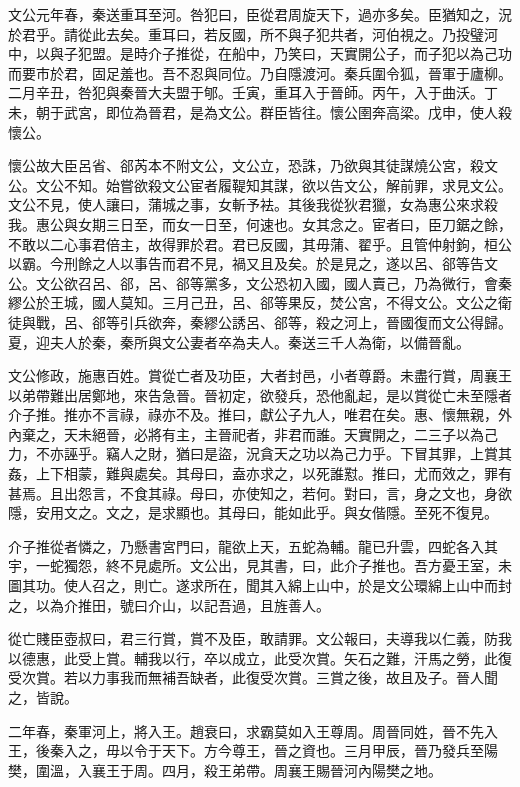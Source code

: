 文公元年春，秦送重耳至河。咎犯曰，臣從君周旋天下，過亦多矣。臣猶知之，況於君乎。請從此去矣。重耳曰，若反國，所不與子犯共者，河伯視之。乃投璧河中，以與子犯盟。是時介子推從，在船中，乃笑曰，天實開公子，而子犯以為己功而要市於君，固足羞也。吾不忍與同位。乃自隱渡河。秦兵圍令狐，晉軍于廬柳。二月辛丑，咎犯與秦晉大夫盟于郇。壬寅，重耳入于晉師。丙午，入于曲沃。丁未，朝于武宮，即位為晉君，是為文公。群臣皆往。懷公圉奔高梁。戊申，使人殺懷公。

懷公故大臣呂省、郤芮本不附文公，文公立，恐誅，乃欲與其徒謀燒公宮，殺文公。文公不知。始嘗欲殺文公宦者履鞮知其謀，欲以告文公，解前罪，求見文公。文公不見，使人讓曰，蒲城之事，女斬予袪。其後我從狄君獵，女為惠公來求殺我。惠公與女期三日至，而女一日至，何速也。女其念之。宦者曰，臣刀鋸之餘，不敢以二心事君倍主，故得罪於君。君已反國，其毋蒲、翟乎。且管仲射鉤，桓公以霸。今刑餘之人以事告而君不見，禍又且及矣。於是見之，遂以呂、郤等告文公。文公欲召呂、郤，呂、郤等黨多，文公恐初入國，國人賣己，乃為微行，會秦繆公於王城，國人莫知。三月己丑，呂、郤等果反，焚公宮，不得文公。文公之衛徒與戰，呂、郤等引兵欲奔，秦繆公誘呂、郤等，殺之河上，晉國復而文公得歸。夏，迎夫人於秦，秦所與文公妻者卒為夫人。秦送三千人為衛，以備晉亂。

文公修政，施惠百姓。賞從亡者及功臣，大者封邑，小者尊爵。未盡行賞，周襄王以弟帶難出居鄭地，來告急晉。晉初定，欲發兵，恐他亂起，是以賞從亡未至隱者介子推。推亦不言祿，祿亦不及。推曰，獻公子九人，唯君在矣。惠、懷無親，外內棄之，天未絕晉，必將有主，主晉祀者，非君而誰。天實開之，二三子以為己力，不亦誣乎。竊人之財，猶曰是盜，況貪天之功以為己力乎。下冒其罪，上賞其姦，上下相蒙，難與處矣。其母曰，盍亦求之，以死誰懟。推曰，尤而效之，罪有甚焉。且出怨言，不食其祿。母曰，亦使知之，若何。對曰，言，身之文也，身欲隱，安用文之。文之，是求顯也。其母曰，能如此乎。與女偕隱。至死不復見。

介子推從者憐之，乃懸書宮門曰，龍欲上天，五蛇為輔。龍已升雲，四蛇各入其宇，一蛇獨怨，終不見處所。文公出，見其書，曰，此介子推也。吾方憂王室，未圖其功。使人召之，則亡。遂求所在，聞其入綿上山中，於是文公環綿上山中而封之，以為介推田，號曰介山，以記吾過，且旌善人。

從亡賤臣壺叔曰，君三行賞，賞不及臣，敢請罪。文公報曰，夫導我以仁義，防我以德惠，此受上賞。輔我以行，卒以成立，此受次賞。矢石之難，汗馬之勞，此復受次賞。若以力事我而無補吾缺者，此復受次賞。三賞之後，故且及子。晉人聞之，皆說。

二年春，秦軍河上，將入王。趙衰曰，求霸莫如入王尊周。周晉同姓，晉不先入王，後秦入之，毋以令于天下。方今尊王，晉之資也。三月甲辰，晉乃發兵至陽樊，圍溫，入襄王于周。四月，殺王弟帶。周襄王賜晉河內陽樊之地。

